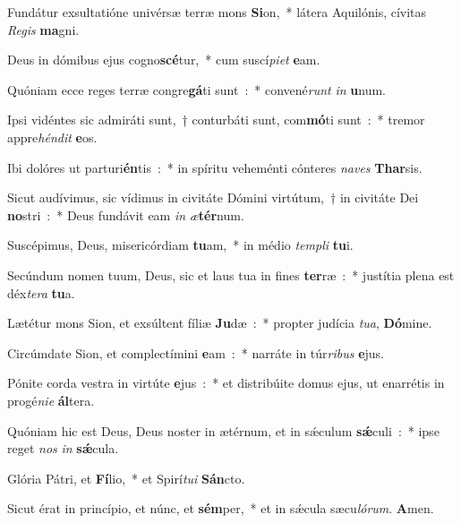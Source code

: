 \item Fundátur exsultatióne univérsæ terræ mons \textbf{Si}on,~* látera Aquilónis, cívitas \emph{Re}\emph{gis} \textbf{ma}gni.
\item Deus in dómibus ejus cogno\textbf{scé}tur,~* cum suscí\emph{pi}\emph{et} \textbf{e}am.
\item Quóniam ecce reges terræ congre\textbf{gá}ti sunt~:~* convené\emph{runt} \emph{in} \textbf{u}num.
\item Ipsi vidéntes sic admiráti sunt,~† conturbáti sunt, com\textbf{mó}ti sunt~:~* tremor appre\emph{hén}\emph{dit} \textbf{e}os.
\item Ibi dolóres ut parturi\textbf{én}tis~:~* in spíritu veheménti cónteres \emph{na}\emph{ves} \textbf{Thar}sis.
\item Sicut audívimus, sic vídimus in civitáte Dómini virtútum,~† in civitáte Dei \textbf{no}stri~:~* Deus fundávit eam \emph{in} \emph{æ}\textbf{tér}num.
\item Suscépimus, Deus, misericórdiam \textbf{tu}am,~* in médio \emph{tem}\emph{pli} \textbf{tu}i.
\item Secúndum nomen tuum, Deus, sic et laus tua in fines \textbf{ter}ræ~:~* justítia plena est déx\emph{te}\emph{ra} \textbf{tu}a.
\item Lætétur mons Sion, et exsúltent fíliæ \textbf{Ju}dæ~:~* propter judícia \emph{tu}\emph{a}, \textbf{Dó}mine.
\item Circúmdate Sion, et complectímini \textbf{e}am~:~* narráte in túr\emph{ri}\emph{bus} \textbf{e}jus.
\item Pónite corda vestra in virtúte \textbf{e}jus~:~* et distribúite domus ejus, ut enarrétis in progé\emph{ni}\emph{e} \textbf{ál}tera.
\item Quóniam hic est Deus, Deus noster in ætérnum, et in sǽculum \textbf{sǽ}culi~:~* ipse reget \emph{nos} \emph{in} \textbf{sǽ}cula.
\item Glória Pátri, et \textbf{Fí}lio,~* et Spirí\emph{tu}\emph{i} \textbf{Sán}cto.
\item Sicut érat in princípio, et núnc, et \textbf{sém}per,~* et in sǽcula sæcu\emph{ló}\emph{rum}. \textbf{A}men.